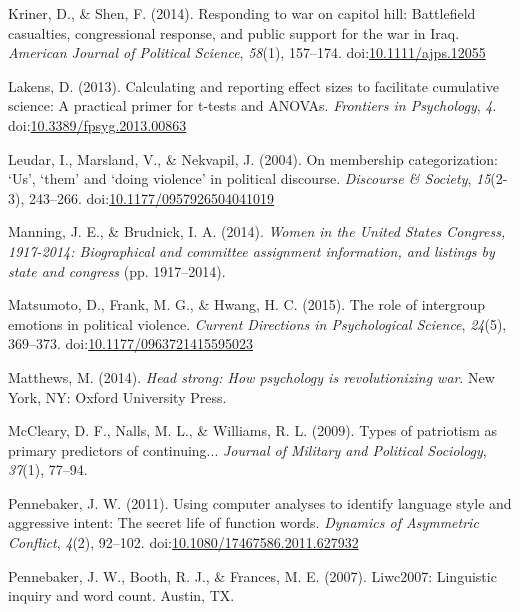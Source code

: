 \documentclass[english,,man]{apa6}
\theoremstyle{definition}
\theoremstyle{definition}
\theoremstyle{definition}
\theoremstyle{remark}
\begin{document}
\leavevmode\hypertarget{ref-Kriner2014}{}%
Kriner, D., \& Shen, F. (2014). Responding to war on capitol hill:
Battlefield casualties, congressional response, and public support for
the war in Iraq. \emph{American Journal of Political Science},
\emph{58}(1), 157--174.
doi:\href{https://doi.org/10.1111/ajps.12055}{10.1111/ajps.12055}

\leavevmode\hypertarget{ref-Lakens2013}{}%
Lakens, D. (2013). Calculating and reporting effect sizes to facilitate
cumulative science: A practical primer for t-tests and ANOVAs.
\emph{Frontiers in Psychology}, \emph{4}.
doi:\href{https://doi.org/10.3389/fpsyg.2013.00863}{10.3389/fpsyg.2013.00863}

\leavevmode\hypertarget{ref-Leudar2004}{}%
Leudar, I., Marsland, V., \& Nekvapil, J. (2004). On membership
categorization: `Us', `them' and `doing violence' in political
discourse. \emph{Discourse \& Society}, \emph{15}(2-3), 243--266.
doi:\href{https://doi.org/10.1177/0957926504041019}{10.1177/0957926504041019}

\leavevmode\hypertarget{ref-Manning2014}{}%
Manning, J. E., \& Brudnick, I. A. (2014). \emph{Women in the United
States Congress, 1917-2014: Biographical and committee assignment
information, and listings by state and congress} (pp. 1917--2014).

\leavevmode\hypertarget{ref-Matsumoto2015}{}%
Matsumoto, D., Frank, M. G., \& Hwang, H. C. (2015). The role of
intergroup emotions in political violence. \emph{Current Directions in
Psychological Science}, \emph{24}(5), 369--373.
doi:\href{https://doi.org/10.1177/0963721415595023}{10.1177/0963721415595023}

\leavevmode\hypertarget{ref-Matthews2014}{}%
Matthews, M. (2014). \emph{Head strong: How psychology is
revolutionizing war}. New York, NY: Oxford University Press.

\leavevmode\hypertarget{ref-McCleary2009}{}%
McCleary, D. F., Nalls, M. L., \& Williams, R. L. (2009). Types of
patriotism as primary predictors of continuing... \emph{Journal of
Military and Political Sociology}, \emph{37}(1), 77--94.

\leavevmode\hypertarget{ref-Pennebaker2011}{}%
Pennebaker, J. W. (2011). Using computer analyses to identify language
style and aggressive intent: The secret life of function words.
\emph{Dynamics of Asymmetric Conflict}, \emph{4}(2), 92--102.
doi:\href{https://doi.org/10.1080/17467586.2011.627932}{10.1080/17467586.2011.627932}

\leavevmode\hypertarget{ref-Pennebaker2007}{}%
Pennebaker, J. W., Booth, R. J., \& Frances, M. E. (2007). Liwc2007:
Linguistic inquiry and word count. Austin, TX.
\end{document}
